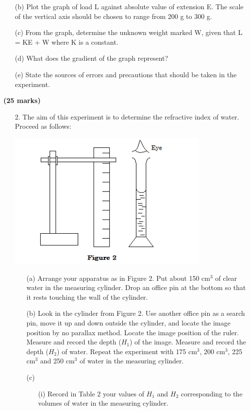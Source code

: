 \begin{enumerate}
\begin{enumerate}
\item[(b)] Plot the graph of load L against absolute value of extension E. The scale of the vertical axis should be chosen to range from 200 g to 300 g.
\item[(c)] From the graph, determine the unknown weight marked W, given that L = KE + W where K is a constant.
\item[(d)] What does the gradient of the graph represent?
\item[(e)] State the sources of errors and precautions that should be taken in the experiment.
\end{enumerate}
\end{enumerate}
\flushright \textbf{(25 marks)}

\pagebreak

\begin{enumerate}
\item[2.] The aim of this experiment is to determine the refractive index of water. Proceed as follows:

\begin{center}
\includegraphics[width=10cm]{./img/2010-2-alt.png}
\end{center}

\begin{enumerate}
\item[(a)] Arrange your apparatus as in Figure 2. Put about 150 cm$^3$ of clear water in the measuring cylinder. Drop an office pin at the bottom so that it rests touching the wall of the cylinder.
\item[(b)] Look in the cylinder from Figure 2. Use another office pin as a search pin, move it up and down outside the cylinder, and locate the image position by no parallax method. Locate the image position of the ruler. Measure and record the depth ($H_1$) of the image. Measure and record the depth ($H_2$) of water. Repeat the experiment with 175 cm$^3$, 200 cm$^3$, 225 cm$^3$ and 250 cm$^3$ of water in the measuring cylinder.
\item[(c)] 
\begin{enumerate}
\item[(i)] Record in Table 2 your values of $H_1$ and $H_2$ corresponding to the volumes of water in the measuring cylinder.\\[10pt]


\end{enumerate}
\end{enumerate}
\end{enumerate}
